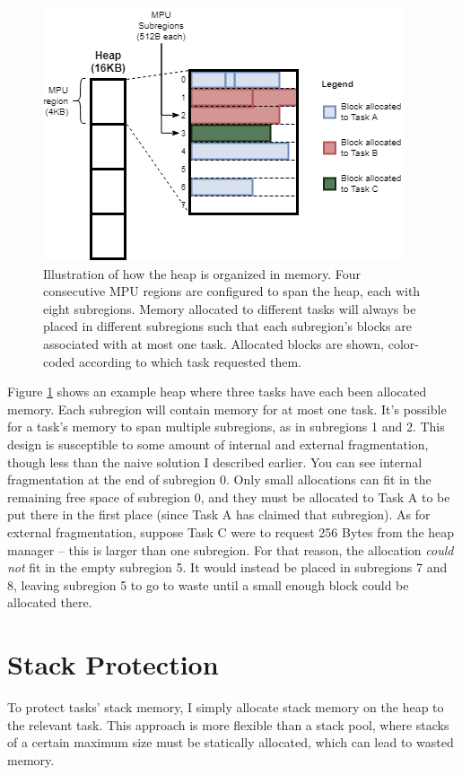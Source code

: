 \begin{figure}[hbtp]
	\centering
	\includegraphics[width=0.7\linewidth]{figs/heap_prot.png}
	\caption{Illustration of how the heap is organized in memory. Four consecutive MPU regions are configured to span the heap, each with eight subregions. Memory allocated to different tasks will always be placed in different subregions such that each subregion's blocks are associated with at most one task. Allocated blocks are shown, color-coded according to which task requested them.}
	\label{fig:heap_prot}
\end{figure}

Figure \ref{fig:heap_prot} shows an example heap where three tasks have each been allocated memory. Each subregion will contain memory for at most one task. It's possible for a task's memory to span multiple subregions, as in subregions 1 and 2. This design is susceptible to some amount of internal and external fragmentation, though less than the naive solution I described earlier. You can see internal fragmentation at the end of subregion 0. Only small allocations can fit in the remaining free space of subregion 0, and they must be allocated to Task A to be put there in the first place (since Task A has claimed that subregion). As for external fragmentation, suppose Task C were to request 256 Bytes from the heap manager -- this is larger than one subregion. For that reason, the allocation \textit{could not} fit in the empty subregion 5. It would instead be placed in subregions 7 and 8, leaving subregion 5 to go to waste until a small enough block could be allocated there.

\section{Stack Protection}

To protect tasks' stack memory, I simply allocate stack memory on the heap to the relevant task. This approach is more flexible than a stack pool, where stacks of a certain maximum size must be statically allocated, which can lead to wasted memory.


